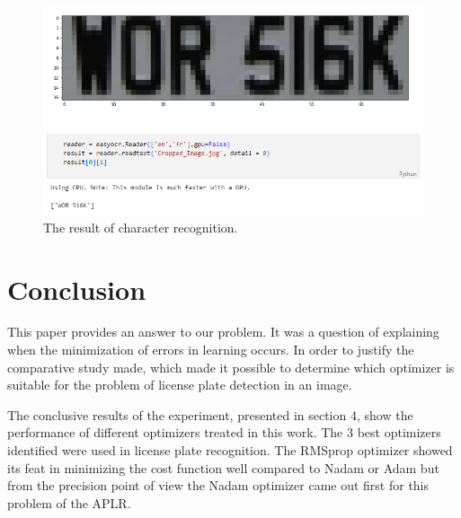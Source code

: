 \documentclass[lnbip]{svmultln}
\begin{document}
	\begin{figure}[H]%
		\centering
		\includegraphics[width=\textwidth]{images/ocr_result}
		\caption{The result of character recognition.}
		\label{fig:ocr_result}
	\end{figure}
	
	
	\section{Conclusion}
	
	This paper provides an answer to our problem. It was a question of explaining when the minimization of errors in learning occurs. In order to justify the comparative study made, which made it possible to determine which optimizer is suitable for the problem of license plate detection in an image.
	
	The conclusive results of the experiment, presented in section 4, show the performance of different optimizers treated in this work. The 3 best optimizers identified were used in license plate recognition. The RMSprop optimizer showed its feat in minimizing the cost function well compared to Nadam or Adam but from the precision point of view the Nadam optimizer came out first for this problem of the APLR.
	
	



%



%
%
%

%
\end{document}
